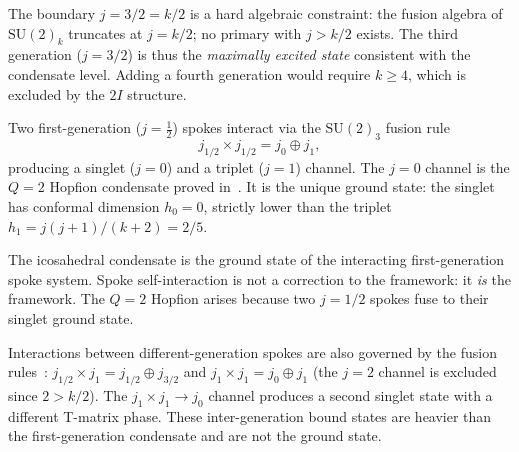 \begin{remark}[Maximality of $j=3/2$]
\label{P4:rem:j32_maximality}
The boundary $j=3/2=k/2$ is a hard algebraic constraint: the fusion algebra
of $\mathrm{SU}(2)_k$ truncates at $j=k/2$; no primary with $j>k/2$ exists.
The third generation ($j=3/2$) is thus the \emph{maximally excited state}
consistent with the condensate level.  Adding a fourth generation would
require $k\geq 4$, which is excluded by the $2I$ structure.
\end{remark}

\begin{theorem}
\label{P4:thm:spoke_ground}
Two first-generation ($j=\tfrac{1}{2}$) spokes interact via the
$\mathrm{SU}(2)_3$ fusion rule~\cite{Verlinde1988}
\begin{equation}
  j_{1/2} \times j_{1/2} = j_0 \oplus j_1,
  \label{P4:eq:fusion}
\end{equation}
producing a singlet ($j=0$) and a triplet ($j=1$) channel.
The $j=0$ channel is the $Q=2$ Hopfion condensate proved in~\cite{Paper3}.
It is the unique ground state: the singlet has conformal dimension
$h_0 = 0$, strictly lower than the triplet $h_1 = j(j+1)/(k+2) = 2/5$.
\end{theorem}

\begin{corollary}
\label{P4:cor:spoke_bound_state}
The icosahedral condensate is the ground state of the interacting
first-generation spoke system.  Spoke self-interaction is not a
correction to the framework: it \emph{is} the framework.  The $Q=2$
Hopfion arises because two $j=1/2$ spokes fuse to their singlet ground state.
\end{corollary}

\begin{remark}
\label{P4:rem:higher_gen_interactions}
Interactions between different-generation spokes are also governed by
the fusion rules~\cite{Verlinde1988}:
$j_{1/2}\times j_1 = j_{1/2}\oplus j_{3/2}$ and
$j_1\times j_1 = j_0\oplus j_1$ (the $j=2$ channel is excluded since $2>k/2$).
The $j_1\times j_1\to j_0$ channel produces a second singlet state with a
different T-matrix phase.  These inter-generation bound states are heavier
than the first-generation condensate and are not the ground state.
\end{remark}

